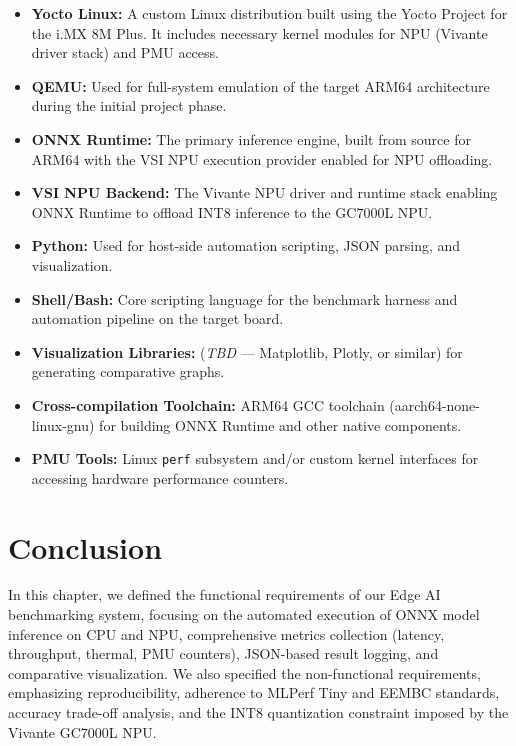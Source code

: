 \begin{itemize}
    \item \textbf{Yocto Linux:} A custom Linux distribution built using the Yocto Project for the i.MX 8M Plus. It includes necessary kernel modules for NPU (Vivante driver stack) and PMU access.
    \item \textbf{QEMU:} Used for full-system emulation of the target ARM64 architecture during the initial project phase.
    \item \textbf{ONNX Runtime:} The primary inference engine, built from source for ARM64 with the VSI NPU execution provider enabled for NPU offloading.
    \item \textbf{VSI NPU Backend:} The Vivante NPU driver and runtime stack enabling ONNX Runtime to offload INT8 inference to the GC7000L NPU.
    \item \textbf{Python:} Used for host-side automation scripting, JSON parsing, and visualization.
    \item \textbf{Shell/Bash:} Core scripting language for the benchmark harness and automation pipeline on the target board.
    \item \textbf{Visualization Libraries:} (\textit{TBD} — Matplotlib, Plotly, or similar) for generating comparative graphs.
    \item \textbf{Cross-compilation Toolchain:} ARM64 GCC toolchain (aarch64-none-linux-gnu) for building ONNX Runtime and other native components.
    \item \textbf{PMU Tools:} Linux \texttt{perf} subsystem and/or custom kernel interfaces for accessing hardware performance counters.
\end{itemize}

\section*{Conclusion}
In this chapter, we defined the functional requirements of our Edge AI benchmarking system, focusing on the automated execution of ONNX model inference on CPU and NPU, comprehensive metrics collection (latency, throughput, thermal, PMU counters), JSON-based result logging, and comparative visualization. We also specified the non-functional requirements, emphasizing reproducibility, adherence to MLPerf Tiny and EEMBC standards, accuracy trade-off analysis, and the INT8 quantization constraint imposed by the Vivante GC7000L NPU.

